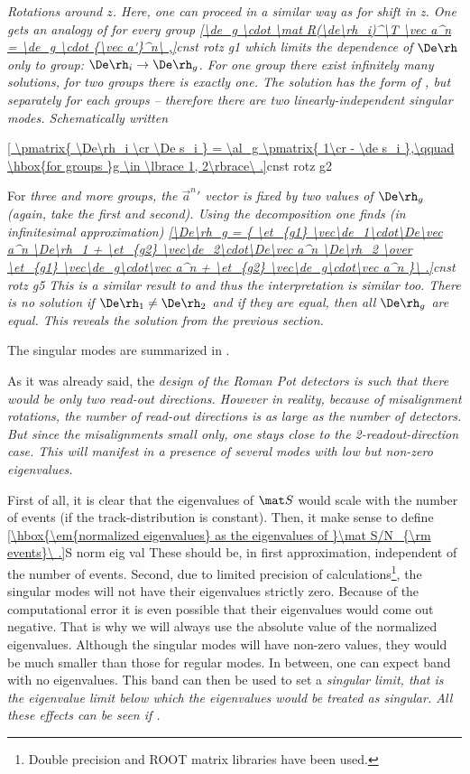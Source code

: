 \em{Rotations around $z$}. Here, one can proceed in a similar way as for shift in z. One gets an analogy of  for every group
\eqref{\de_g \cdot \mat R(\de\rh_i)^\T \vec a^n = \de_g \cdot {\vec a'}^n\ ,}{cnst rotz g1}
 which limits the dependence of $\De\rh$ only to group: $\De\rh_i \rightarrow \De\rh_g$. For \em{one} group there exist infinitely many solutions, for \em{two groups} there is exactly one. The solution has the form of , but separately for each groups -- therefore there are two linearly-independent singular modes. Schematically written

\eqref{
\pmatrix{
\De\rh_i \cr
\De s_i
} = \al_g \pmatrix{
1\cr
- \de s_i
},\qquad \hbox{for groups }g \in \lbrace 1, 2\rbrace\ .}{cnst rotz g2}


For \em{three and more groups}, the ${\vec a^n}'$ vector is fixed by two values of $\De\rh_g$ (again, take the first and second). Using the decomposition  one finds (in infinitesimal approximation)
\eqref{\De\rh_g = {
\et_{g1} \vec\de_1\cdot\De\vec a^n \De\rh_1 + \et_{g2} \vec\de_2\cdot\De\vec a^n \De\rh_2
\over
\et_{g1} \vec\de_g\cdot\vec a^n + \et_{g2} \vec\de_g\cdot\vec a^n
}\ .}{cnst rotz g5}
This is a similar result to  and thus the interpretation is similar too. There is no solution if $\De\rh_1 \neq \De\rh_2$ and if they are equal, then all $\De\rh_g$ are equal. This reveals the solution  from the previous section.

The singular modes are summarized in .

As it was already said, the \em{design} of the Roman Pot detectors is such that there would be only two read-out directions. However in \em{reality}, because of misalignment rotations, the number of read-out directions is as large as the number of detectors. But since the misalignments small only, one stays close to the 2-readout-direction case. This will manifest in a presence of several modes with low but non-zero eigenvalues. 

 First of all, it is clear that the eigenvalues of $\mat S$ would scale with the number of events (if the track-distribution is constant). Then, it make sense to define
\eqref{\hbox{\em{normalized eigenvalues} as the eigenvalues of }\mat S/N_{\rm events}\ .}{S norm eig val}
These should be, in first approximation, independent of the number of events. Second, due to limited precision of calculations\footnote{Double precision and ROOT matrix libraries have been used.}, the singular modes will not have their eigenvalues strictly zero. Because of the computational error it is even possible that their eigenvalues would come out negative. That is why we will always use the absolute value of the normalized eigenvalues. Although the singular modes will have non-zero values, they would be much smaller than those for regular modes. In between, one can expect band with no eigenvalues. This band can then be used to set a \em{singular limit}, that is the eigenvalue limit below which the eigenvalues would be treated as singular. All these effects can be seen if .

